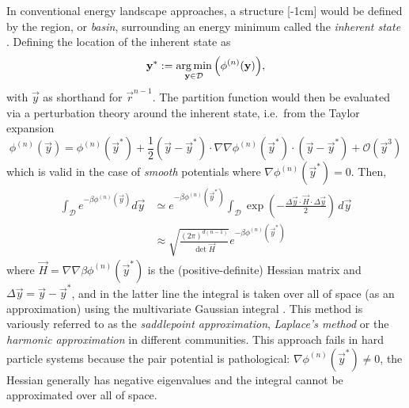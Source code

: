 \documentclass[11pt,twoside]{report}
\begin{document}
In conventional energy landscape approaches, a structure%
[-1cm]
would be defined by the region, or \emph{basin}, surrounding an energy minimum called the \emph{inherent state} \cite{StillingerPRA1982,StillingerS1995,Wales2004}.
Defining the location of the inherent state as
\begin{equation*}
  \boldsymbol{\mathbf{y}}^*
  :=
  \operatorname*{arg\,min}_{\boldsymbol{\mathbf{y}} \in \mathcal{D}}{\left( \phi^{(n)}(\boldsymbol{\mathbf{y}}) \right)},
\end{equation*}
with $\vec{y}$ as shorthand for $\vec{r}^{n-1}$.
The partition function would then be evaluated via a perturbation theory around the inherent state, i.e.\ from the Taylor expansion \cite{Wales2004}
\begin{equation*}
  \phi^{(n)}(\vec{y})
  =
  \phi^{(n)}(\vec{y}^*)
  + \frac{1}{2} (\vec{y} - \vec{y}^*) \cdot
  \nabla\nabla \phi^{(n)}(\vec{y}^*)
  \cdot (\vec{y} - \vec{y}^*)
  + \mathcal{O}(\vec{y}^3)
\end{equation*}
which is valid in the case of \emph{smooth} potentials where $\nabla \phi^{(n)}(\vec{y}^*) = 0$.
Then, \cite{Wales2004}
\begin{equation}\label{eq:harmonic-approximation}
  \begin{split}
    \int_\mathcal{D} e^{-\beta\phi^{(n)}(\vec{y})} d\vec{y}
    &\simeq
    e^{-\beta\phi^{(n)}(\vec{y}^*)}
    \int_\mathcal{D}
    \exp{\left( - \frac{\Delta\vec{y} \cdot \vec{H} \cdot \Delta\vec{y}}{2} \right)}
    \, d\vec{y}
    \\ &\approx
    \sqrt{ \frac{(2\pi)^{d(n-1)}}{\det \vec{H}} }
    e^{-\beta\phi^{(n)}(\vec{y}^*)}
  \end{split}
\end{equation}
where $\vec{H} = \nabla\nabla \beta \phi^{(n)}(\vec{y}^*)$ is the (positive-definite) Hessian matrix and $\Delta \vec{y} = \vec{y} - \vec{y}^*$, and in the latter line the integral is taken over all of space (as an approximation) using the multivariate Gaussian integral%
.
This method is variously referred to as the \emph{saddlepoint approximation}, \emph{Laplace's method} or the \emph{harmonic approximation} in different communities.
This approach fails in hard particle systems because the pair potential is pathological: $\nabla \phi^{(n)}(\vec{y}^*) \ne 0$, the Hessian generally has negative eigenvalues and the integral cannot be approximated over all of space.
\end{document}
